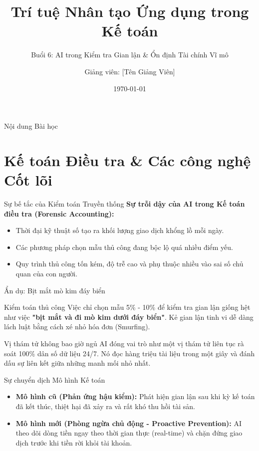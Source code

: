 \documentclass[aspectratio=169]{beamer}
\title[TTNT trong Kế toán - Buổi 6]{Trí tuệ Nhân tạo Ứng dụng trong Kế toán}
\subtitle{Buổi 6: AI trong Kiểm tra Gian lận \& Ổn định Tài chính Vĩ mô}
\author{Giảng viên: [Tên Giảng Viên]}
\institute{Đại học Đông Á}
\date{\today}
\begin{document}
\begin{frame}
    \titlepage
\end{frame}

\begin{frame}{Nội dung Bài học}
    \tableofcontents
\end{frame}

\section{Kế toán Điều tra \& Các công nghệ Cốt lõi}

\begin{frame}{Sự bế tắc của Kiểm toán Truyền thống}
    \textbf{Sự trỗi dậy của AI trong Kế toán điều tra (Forensic Accounting):}
    \begin{itemize}
        \item Thời đại kỹ thuật số tạo ra khối lượng giao dịch khổng lồ mỗi ngày.
        \item Các phương pháp chọn mẫu thủ công đang bộc lộ quá nhiều điểm yếu.
        \item Quy trình thủ công tốn kém, độ trễ cao và phụ thuộc nhiều vào sai số chủ quan của con người.
    \end{itemize}
\end{frame}

\begin{frame}{Ẩn dụ: Bịt mắt mò kim đáy biển}
    \begin{exampleblock}{Kiểm toán thủ công}
        Việc chỉ chọn mẫu 5\% - 10\% để kiểm tra gian lận giống hệt như việc \textbf{"bịt mắt và đi mò kim dưới đáy biển"}. Kẻ gian lận tinh vi dễ dàng lách luật bằng cách xé nhỏ hóa đơn (Smurfing).
    \end{exampleblock}
    \vspace{0.3cm}
    \begin{alertblock}{Vị thám tử không bao giờ ngủ}
        AI đóng vai trò như một vị thám tử liên tục rà soát 100\% dân số dữ liệu 24/7. Nó đọc hàng triệu tài liệu trong một giây và đánh dấu sự liên kết giữa những manh mối nhỏ nhất.
    \end{alertblock}
\end{frame}

\begin{frame}{Sự chuyển dịch Mô hình Kế toán}
    \begin{itemize}
        \item \textbf{Mô hình cũ (Phản ứng hậu kiểm):} Phát hiện gian lận sau khi kỳ kế toán đã kết thúc, thiệt hại đã xảy ra và rất khó thu hồi tài sản.
        \item \textbf{Mô hình mới (Phòng ngừa chủ động - Proactive Prevention):} AI theo dõi dòng tiền ngay theo thời gian thực (real-time) và chặn đứng giao dịch trước khi tiền rời khỏi tài khoản.
    \end{itemize}
\end{frame}
\end{document}

